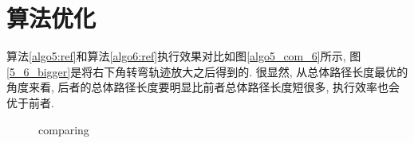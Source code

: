 \documentclass[UTF8,a4paper,10pt,nocolorlinks]{ctexart}
\begin{document}
    \section{算法优化} 
    算法\ref{algo5:ref}和算法\ref{algo6:ref}执行效果对比如图\ref{algo5_com_6}所示, 图\ref{5_6_bigger}是将右下角转弯轨迹放大之后得到的. 很显然, 从总体路径长度最优的角度来看, 后者的总体路径长度要明显比前者总体路径长度短很多, 执行效率也会优于前者.
    \begin{figure}[h]
        \centering
        \caption{comparing}
    \end{figure}
\end{document}
